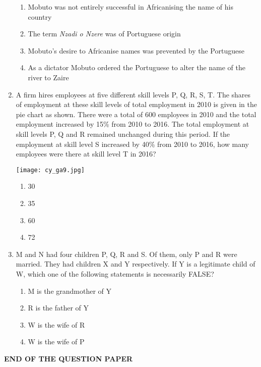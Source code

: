 \documentclass[12pt]{article}
\begin{document}
\begin{enumerate}[label=Q.\arabic*]
\begin{enumerate}[label=(\Alph*)]
\item Mobuto was not entirely successful in Africanising the name of his country
\item The term \emph{Nzadi o Nzere} was of Portuguese origin
\item Mobuto’s desire to Africanise names was prevented by the Portuguese
\item As a dictator Mobuto ordered the Portuguese to alter the name of the river to Zaire
\end{enumerate}
\item A firm hires employees at five different skill levels P, Q, R, S, T. The shares of employment at these skill levels of total employment in 2010 is given in the pie chart as shown. There were a total of 600 employees in 2010 and the total employment increased by 15\% from 2010 to 2016. The total employment at skill levels P, Q and R remained unchanged during this period. If the employment at skill level S increased by 40\% from 2010 to 2016, how many employees were there at skill level T in 2016?

\begin{center}
\texttt{[image: cy\_ga9.jpg]} 
\end{center}

\begin{enumerate}[label=(\Alph*)]
\item 30
\item 35
\item 60
\item 72
\end{enumerate}

\item M and N had four children P, Q, R and S. Of them, only P and R were married. They had children X and Y respectively. If Y is a legitimate child of W, which one of the following statements is necessarily FALSE?

\begin{enumerate}[label=(\Alph*)]
\item M is the grandmother of Y
\item R is the father of Y
\item W is the wife of R
\item W is the wife of P
\end{enumerate}
\end{enumerate}

\begin{center}
{
	\textbf{END OF THE QUESTION PAPER}
}
\end{center}
\end{document}
